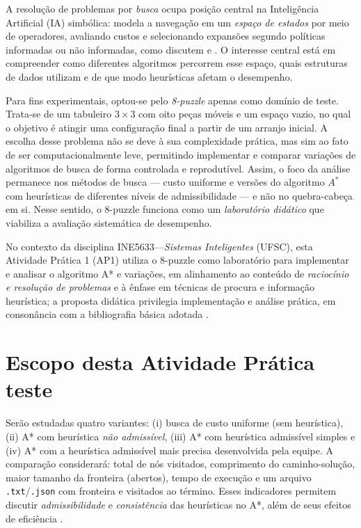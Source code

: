 
A resolução de problemas por \emph{busca} ocupa posição central na Inteligência Artificial (IA) simbólica: modela a 
navegação em um \emph{espaço de estados} por meio de operadores, avaliando custos e selecionando expansões 
segundo políticas informadas ou não informadas, como discutem  e 
. O interesse central está em compreender como diferentes algoritmos percorrem esse espaço, 
quais estruturas de dados utilizam e de que modo heurísticas afetam o desempenho.

Para fins experimentais, optou-se pelo \emph{8-puzzle} apenas como domínio de teste. Trata-se de um tabuleiro 
$3\times 3$ com oito peças móveis e um espaço vazio, no qual o objetivo é atingir uma configuração final a partir 
de um arranjo inicial. A escolha desse problema não se deve à sua complexidade prática, mas sim ao fato de ser 
computacionalmente leve, permitindo implementar e comparar variações de algoritmos de busca de forma controlada e 
reprodutível. Assim, o foco da análise permanece nos métodos de busca --- custo uniforme e versões do algoritmo $A^*$ 
com heurísticas de diferentes níveis de admissibilidade --- e não no quebra-cabeça em si. Nesse sentido, o 8-puzzle 
funciona como um \emph{laboratório didático} que viabiliza a avaliação sistemática de desempenho.


No contexto da disciplina INE5633---\emph{Sistemas Inteligentes} (UFSC), esta Atividade Prática 1 (AP1) utiliza o 8-puzzle como laboratório para implementar e analisar o algoritmo A* e variações, em alinhamento ao conteúdo de \emph{raciocínio e resolução de problemas} e à ênfase em técnicas de procura e informação heurística; a proposta didática privilegia implementação e análise prática, em consonância com a bibliografia básica adotada \cite{russell2010artificial,luger2009artificial}.

\section{Escopo desta Atividade Prática teste}
Serão estudadas quatro variantes: (i) busca de custo uniforme (sem heurística), (ii) A* com heurística \emph{não admissível}, (iii) A* com heurística admissível simples e (iv) A* com a heurística admissível mais precisa desenvolvida pela equipe. A comparação considerará: total de nós visitados, comprimento do caminho-solução, maior tamanho da fronteira (abertos), tempo de execução e um arquivo \texttt{.txt}/\texttt{.json} com fronteira e visitados ao término. Esses indicadores permitem discutir \emph{admissibilidade} e \emph{consistência} das heurísticas no A*, além de seus efeitos de eficiência \cite{russell2010artificial,luger2009artificial}.

